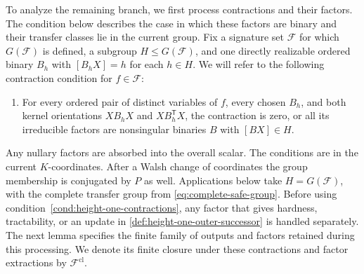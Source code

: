 \documentclass[11pt,letterpaper,onecolumn]{article}
\theoremstyle{plain}
\theoremstyle{definition}
\theoremstyle{remark}
\newcommand{\cF}{\mathcal F}
\begin{document}
To analyze the remaining branch, we first process contractions and their
factors. The condition below describes the case in which these factors are
binary and their transfer classes lie in the current group. Fix a signature set
	\(\cF\) for which \(G(\cF)\) is defined, a
	subgroup \(H\le G(\cF)\), and one directly realizable ordered binary
	\(B_h\) with \([B_hX]=h\) for each \(h\in H\).  We will refer to the
	following contraction condition for \(f\in\cF\):
	\begin{enumerate}[label=\textnormal{(C)},leftmargin=*]
		\item\label{cond:height-one-contractions}
		For every ordered pair of distinct variables of \(f\), every chosen \(B_h\),
		and both kernel orientations \(XB_hX\) and \(XB_h^{\mathsf T}X\), the
		contraction is zero, or all its irreducible factors are
		nonsingular binaries \(B\) with \([BX]\in H\).
	\end{enumerate}
	Any nullary factors are absorbed into the overall scalar.
	The conditions are in the current \(K\)-coordinates. After a Walsh change
	of coordinates the group membership is conjugated by \(P\) as well.
	Applications below take \(H=G(\cF)\), with the complete transfer group from
	\cref{eq:complete-safe-group}.  Before using
	condition~\ref{cond:height-one-contractions}, any factor that gives
	hardness, tractability, or an update in
	\cref{def:height-one-outer-successor} is handled separately.  The next lemma specifies the finite family of outputs and factors retained
	during this processing. We denote its finite closure under these
contractions and factor extractions by \(\cF^{\mathrm{cl}}\).
	
\end{document}
